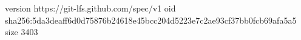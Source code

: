 version https://git-lfs.github.com/spec/v1
oid sha256:5da3deaff6d0d75876b24618e45bcc204d5223e7c2ae93cf37bb0fcb69afa5a5
size 3403
